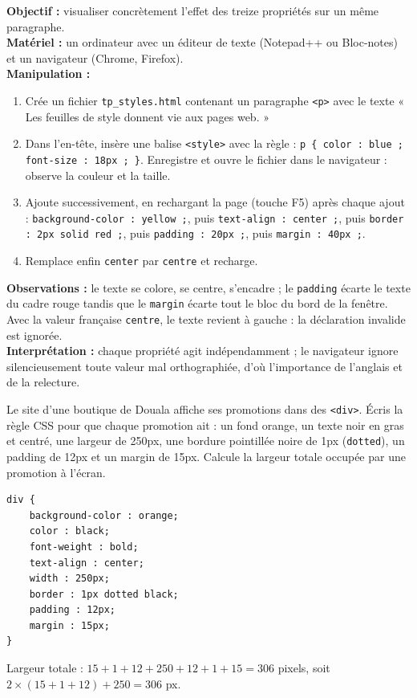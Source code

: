 \documentclass[11pt]{article}
\begin{document}
\begin{experience}
\textbf{Objectif :} visualiser concrètement l'effet des treize propriétés sur un même paragraphe.\\
\textbf{Matériel :} un ordinateur avec un éditeur de texte (Notepad++ ou Bloc-notes) et un navigateur (Chrome, Firefox).\\
\textbf{Manipulation :}
\begin{enumerate}
\item Crée un fichier \texttt{tp\_styles.html} contenant un paragraphe \texttt{<p>} avec le texte « Les feuilles de style donnent vie aux pages web. »
\item Dans l'en-tête, insère une balise \texttt{<style>} avec la règle : \texttt{p \{ color : blue ; font-size : 18px ; \}}. Enregistre et ouvre le fichier dans le navigateur : observe la couleur et la taille.
\item Ajoute successivement, en rechargant la page (touche F5) après chaque ajout : \texttt{background-color : yellow ;}, puis \texttt{text-align : center ;}, puis \texttt{border : 2px solid red ;}, puis \texttt{padding : 20px ;}, puis \texttt{margin : 40px ;}.
\item Remplace enfin \texttt{center} par \texttt{centre} et recharge.
\end{enumerate}
\textbf{Observations :} le texte se colore, se centre, s'encadre ; le \texttt{padding} écarte le texte du cadre rouge tandis que le \texttt{margin} écarte tout le bloc du bord de la fenêtre. Avec la valeur française \texttt{centre}, le texte revient à gauche : la déclaration invalide est ignorée.\\
\textbf{Interprétation :} chaque propriété agit indépendamment ; le navigateur ignore silencieusement toute valeur mal orthographiée, d'où l'importance de l'anglais et de la relecture.
\end{experience}

\begin{exercice}
Le site d'une boutique de Douala affiche ses promotions dans des \texttt{<div>}. Écris la règle CSS pour que chaque promotion ait : un fond orange, un texte noir en gras et centré, une largeur de 250px, une bordure pointillée noire de 1px (\texttt{dotted}), un padding de 12px et un margin de 15px. Calcule la largeur totale occupée par une promotion à l'écran.
\end{exercice}

\begin{corrige}[Exercice]
\begin{lstlisting}
div {
    background-color : orange;
    color : black;
    font-weight : bold;
    text-align : center;
    width : 250px;
    border : 1px dotted black;
    padding : 12px;
    margin : 15px;
}
\end{lstlisting}
Largeur totale : $15 + 1 + 12 + 250 + 12 + 1 + 15 = 306$ pixels, soit $2 \times (15 + 1 + 12) + 250 = 306$ px.
\end{corrige}
\end{document}

